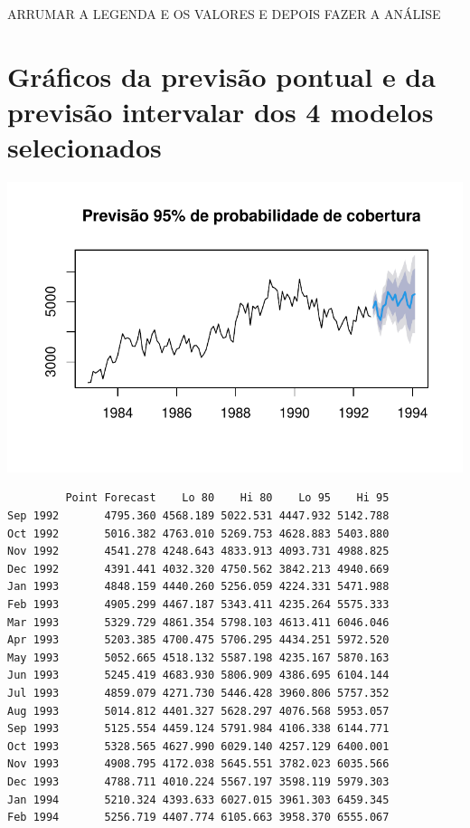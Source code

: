 \documentclass[
  letterpaper,
  DIV=11,
  numbers=noendperiod]{scrartcl}
\begin{document}
ARRUMAR A LEGENDA E OS VALORES E DEPOIS FAZER A ANÁLISE

\hypertarget{gruxe1ficos-da-previsuxe3o-pontual-e-da-previsuxe3o-intervalar-dos-4-modelos-selecionados}{%
\section{Gráficos da previsão pontual e da previsão intervalar dos 4
modelos
selecionados}\label{gruxe1ficos-da-previsuxe3o-pontual-e-da-previsuxe3o-intervalar-dos-4-modelos-selecionados}}

\includegraphics{T2_grupo5_files/figure-pdf/previsao-pontual-1.pdf}

\begin{verbatim}
         Point Forecast    Lo 80    Hi 80    Lo 95    Hi 95
Sep 1992       4795.360 4568.189 5022.531 4447.932 5142.788
Oct 1992       5016.382 4763.010 5269.753 4628.883 5403.880
Nov 1992       4541.278 4248.643 4833.913 4093.731 4988.825
Dec 1992       4391.441 4032.320 4750.562 3842.213 4940.669
Jan 1993       4848.159 4440.260 5256.059 4224.331 5471.988
Feb 1993       4905.299 4467.187 5343.411 4235.264 5575.333
Mar 1993       5329.729 4861.354 5798.103 4613.411 6046.046
Apr 1993       5203.385 4700.475 5706.295 4434.251 5972.520
May 1993       5052.665 4518.132 5587.198 4235.167 5870.163
Jun 1993       5245.419 4683.930 5806.909 4386.695 6104.144
Jul 1993       4859.079 4271.730 5446.428 3960.806 5757.352
Aug 1993       5014.812 4401.327 5628.297 4076.568 5953.057
Sep 1993       5125.554 4459.124 5791.984 4106.338 6144.771
Oct 1993       5328.565 4627.990 6029.140 4257.129 6400.001
Nov 1993       4908.795 4172.038 5645.551 3782.023 6035.566
Dec 1993       4788.711 4010.224 5567.197 3598.119 5979.303
Jan 1994       5210.324 4393.633 6027.015 3961.303 6459.345
Feb 1994       5256.719 4407.774 6105.663 3958.370 6555.067
\end{verbatim}
\end{document}
